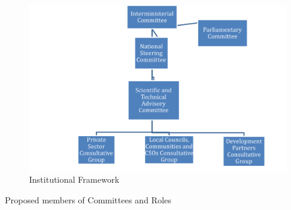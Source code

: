 \documentclass[
]{book}
\begin{document}
\begin{figure}
\centering
\includegraphics{images/inst-framwk.png}
\caption{Institutional Framework}
\end{figure}

Proposed members of Committees and Roles

\providecommand{\docline}[3]{\noalign{\global\setlength{\arrayrulewidth}{#1}}\arrayrulecolor[HTML]{#2}\cline{#3}}

\setlength{\tabcolsep}{2pt}

\renewcommand*{\arraystretch}{1.5}
\end{document}
